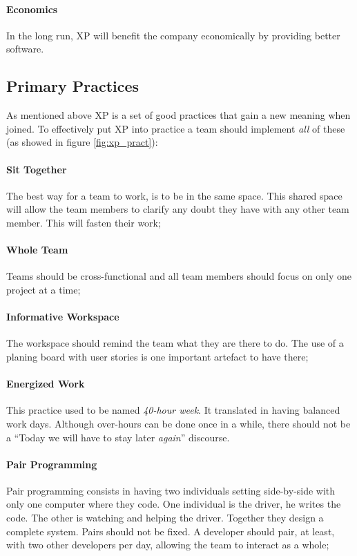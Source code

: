 \documentclass[conference]{IEEEtran}
\begin{document}
\paragraph{Economics} In the long run, XP will benefit the company economically by providing better software.

\subsection{Primary Practices}
As mentioned above XP is a set of good practices that gain a new meaning when joined. To effectively put XP into practice a team should implement \textit{all} of these (as showed in figure \ref{fig:xp_pract}):

\paragraph{Sit Together} The best way for a team to work, is to be in the same space. This shared space will allow the team members to clarify any doubt they have with any other team member. This will fasten their work;
\paragraph{Whole Team} Teams should be cross-functional and all team members should focus on only one project at a time;
\paragraph{Informative Workspace} The workspace should remind the team what they are there to do. The use of a planing board with user stories is one important artefact to have there;
\paragraph{Energized Work} This practice used to be named \textit{40-hour week}. It translated in having balanced work days. Although over-hours can be done once in a while, there should not be a ``Today we will have to stay later \textit{again}'' discourse.
\paragraph{Pair Programming} Pair programming consists in having two individuals setting side-by-side with only one computer where they code. One individual is the driver, he writes the code. The other is watching and helping the driver. Together they design a complete system. Pairs should not be fixed. A developer should pair, at least, with two other developers per day, allowing the team to interact as a whole;
\end{document}
